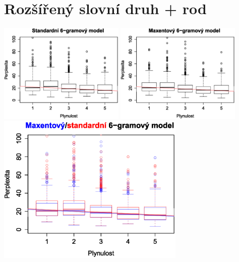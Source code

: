 \documentclass[12pt,a4paper]{report}
\begin{document}
\section{Rozšířený slovní druh + rod}
\begin{center}
	\includegraphics[width=60mm]{./grafy/morf/ngram/rsd+rod.svg.eps}
	\includegraphics[width=60mm]{./grafy/morf/maxent/rsd+rod.svg.eps}
	\includegraphics[width=90mm]{./grafy/morf/porovnani/rsd+rod.svg.eps}	
\end{center}
\end{document}
